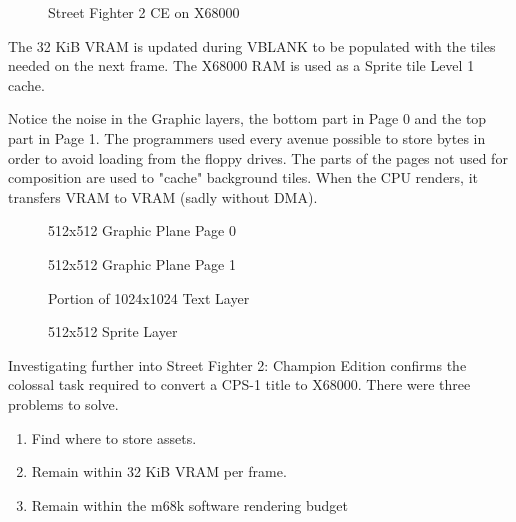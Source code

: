 \begin{figure}[H]
\caption*{Street Fighter 2 CE on X68000}
\end{figure}


\pagebreak

The 32 KiB VRAM is updated during VBLANK to be populated with the tiles needed on the next frame. The X68000 RAM is used as a Sprite tile Level 1 cache.

Notice the noise in the Graphic layers, the bottom part in Page 0 and the top part in Page 1. The programmers used every avenue possible to store bytes in order to avoid loading from the floppy drives. The parts of the pages not used for composition are used to "cache" background tiles. When the CPU renders, it transfers VRAM to VRAM (sadly without DMA).

\vspace{-4ex}
\begin{minipage}[t]{0.49\linewidth}
  \begin{figure}[H]
  \caption*{512x512 Graphic Plane Page 0}
  \end{figure}
\end{minipage}%
\hfill
\begin{minipage}[t]{0.49\linewidth}
  \begin{figure}[H]
  \caption*{512x512 Graphic Plane Page 1}
  \end{figure}
\end{minipage}%

\begin{minipage}[t]{0.49\linewidth}
  \begin{figure}[H]
  \caption*{Portion of 1024x1024 Text Layer}
  \end{figure}
\end{minipage}%
\hfill
\begin{minipage}[t]{0.49\linewidth}
   \begin{figure}[H]
  \caption*{512x512 Sprite Layer}
  \end{figure}
\end{minipage}%

\pagebreak

Investigating further into Street Fighter 2: Champion Edition confirms the colossal task required to convert a CPS-1 title to X68000. There were three problems to solve.

\begin{enumerate}
\item Find where to store assets.
\item Remain within 32 KiB VRAM per frame.
\item Remain within the m68k software rendering budget
\end{enumerate}

